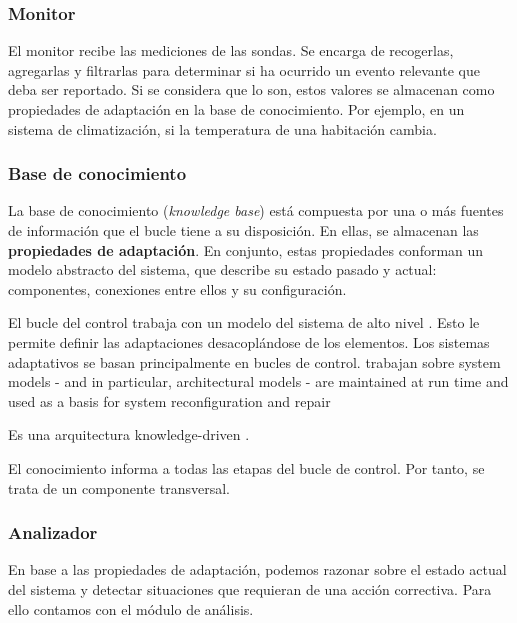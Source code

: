 \subsubsection{Monitor}
El monitor recibe las mediciones de las sondas. Se encarga de recogerlas, agregarlas y filtrarlas para determinar si ha ocurrido un evento relevante que deba ser reportado. Si se considera que lo son, estos valores se almacenan como propiedades de adaptación en la base de conocimiento. \cite{fonsEspecificacionSistemasAutoadaptativos2021} Por ejemplo, en un sistema de climatización, si la temperatura de una habitación cambia.


\subsubsection{Base de conocimiento}

La base de conocimiento (\emph{knowledge base}) está compuesta por una o más fuentes de información que el bucle tiene a su disposición. En ellas, se almacenan las \textbf{propiedades de adaptación}. En conjunto, estas propiedades conforman un modelo abstracto del sistema, que describe su estado pasado y actual: componentes, conexiones entre ellos y su configuración. \cite{garlanIncreasingSystemDependability2003}

El bucle del control trabaja con un modelo del sistema de alto nivel \cite{garlanIncreasingSystemDependability2003}. Esto le permite definir las adaptaciones desacoplándose de los elementos. Los sistemas adaptativos se basan principalmente en bucles de control. trabajan sobre system models - and in particular, architectural models - are maintained at run time
and used as a basis for system reconfiguration and repair \cite{garlanIncreasingSystemDependability2003}

Es una arquitectura knowledge-driven \cite{taylorSoftwareArchitectureFoundations2009}.

El conocimiento informa a todas las etapas del bucle de control. Por tanto, se trata de un componente transversal.

\subsubsection{Analizador}

En base a las propiedades de adaptación, podemos razonar sobre el estado actual del sistema y detectar situaciones que requieran de una acción correctiva. Para ello contamos con el módulo de análisis.

